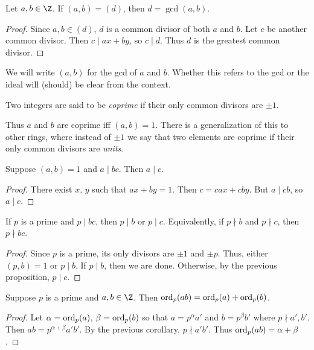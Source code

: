 \begin{corollary}
    Let $a, b \in \Z$.
    If $(a, b) = (d)$, then $d = \gcd(a, b)$.
\end{corollary}
\begin{proof}
    Since $a, b \in (d)$, $d$ is a common divisor of both $a$
    and $b$.
    Let $c$ be another common divisor.
    Then $c \mid ax + by$, so $c \mid d$.
    Thus $d$ is the greatest common divisor.
\end{proof}

\begin{notation}
    We will write $(a, b)$ for the gcd of $a$ and $b$.
    Whether this refers to the gcd or the ideal will (should) be clear
    from the context.
\end{notation}
\begin{definition}[Coprime] \label{def:coprime}
    Two integers are said to be \emph{coprime} if their only common divisors
    are $\pm 1$.
\end{definition}
Thus $a$ and $b$ are coprime iff $(a, b) = 1$.
There is a generalization of this to other rings,
where instead of $\pm 1$ we say that two elements are coprime if
their only common divisors are \emph{units}.

\begin{proposition*}
    Suppose $(a, b) = 1$ and $a \mid bc$.
    Then $a \mid c$.
\end{proposition*}
\begin{proof}
    There exist $x$, $y$ such that $ax + by = 1$.
    Then $c = cax + cby$.
    But $a \mid cb$, so $a \mid c$.
\end{proof}

\begin{corollary}
    If $p$ is a prime and $p \mid bc$, then $p \mid b$ or $p \mid c$.
    Equivalently, if $p \nmid b$ and $p \nmid c$, then $p \nmid bc$.
\end{corollary}
\begin{proof}
    Since $p$ is a prime, its only divisors are $\pm 1$ and $\pm p$.
    Thus, either $(p, b) = 1$ or $p \mid b$.
    If $p \mid b$, then we are done.
    Otherwise, by the previous proposition, $p \mid c$.
\end{proof}

\begin{corollary} \label{thm:order_of_product}
    Suppose $p$ is a prime and $a, b \in \Z$.
    Then $\operatorname{ord}_p(ab) = \operatorname{ord}_p(a) + \operatorname{ord}_p(b)$.
\end{corollary}
\begin{proof}
    Let $\alpha = \operatorname{ord}_p(a)$, $\beta = \operatorname{ord}_p(b)$ so that
    $a = p^\alpha a'$ and $b = p^\beta b'$ where $p \nmid a', b'$.
    Then $ab = p^{\alpha + \beta} a' b'$.
    By the previous corollary, $p \nmid a'b'$.
    Thus $\operatorname{ord}_p(ab) = \alpha + \beta$.
\end{proof}

